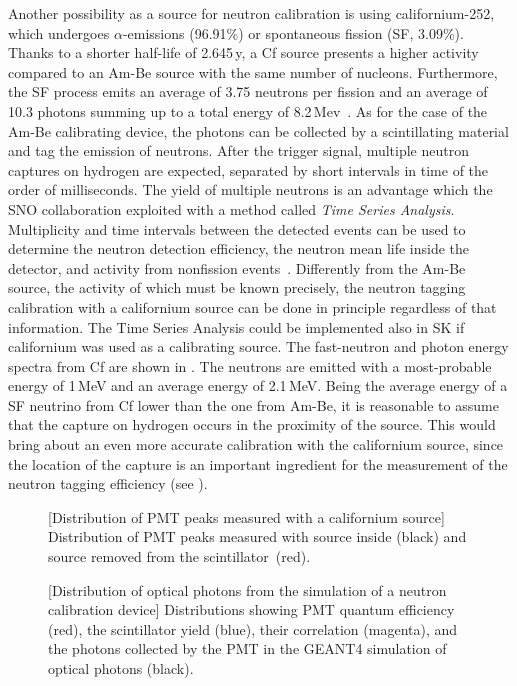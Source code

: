 Another possibility as a source for neutron calibration is using californium-252, which %
undergoes $\alpha$-emissions (96.91\%) or spontaneous fission (SF, 3.09\%).
Thanks to a shorter half-life of 2.645\,y, a Cf source presents a higher activity compared to an Am-Be source %
with the same number of nucleons.
Furthermore, the SF process emits an average of 3.75 neutrons per fission and an average of 10.3 photons %
summing up to a total energy of 8.2\,Mev~\cite{PhysRev.104.699}.
As for the case of the Am-Be calibrating device, the photons can be collected by a scintillating material %
and tag the emission of neutrons.
After the trigger signal, multiple neutron captures on hydrogen are expected, separated by short intervals in time %
of the order of milliseconds.
The yield of multiple neutrons is an advantage which the SNO collaboration exploited with a method %
called \emph{Time Series Analysis}.
Multiplicity and time intervals between the detected events can be used to determine the neutron detection efficiency, %
the neutron mean life inside the detector, and activity from nonfission events~\cite{Labranche:2004sya}.
Differently from the Am-Be source, the activity of which must be known precisely, the neutron tagging calibration %
with a californium source can be done in principle regardless of that information.
The Time Series Analysis could be implemented also in SK if californium was used as a calibrating source.
The fast-neutron and photon energy spectra from Cf are shown in . 
The neutrons are emitted with a most-probable energy of 1\,MeV and an average energy of 2.1\,MeV.
Being the average energy of a SF neutrino from Cf lower than the one from Am-Be, %
it is reasonable to assume that the capture on hydrogen occurs in the proximity of the source.
This would bring about an even more accurate calibration with the californium source, %
since the location of the capture is an important ingredient for the measurement %
of the neutron tagging efficiency (see ).


\begin{figure}
	\begin{minipage}[t]{0.48\textwidth}
		\centering
		\resizebox{\textwidth}{!}{}
		[Distribution of PMT peaks measured with a californium source]%
		{Distribution of PMT peaks measured with source inside (black) and source removed from the scintillator~(red).}
		\label{fig:source}
	\end{minipage}
	\hfill
	\begin{minipage}[t]{0.48\textwidth}
		\centering
		\resizebox{\textwidth}{!}{}
		[Distribution of optical photons from the simulation of a neutron calibration device]{%
			Distributions showing PMT quantum efficiency (red), the scintillator yield (blue), %
			their correlation (magenta), and the photons collected by the PMT in the GEANT4 %
			simulation of optical photons (black).}
		\label{fig:QE}
	\end{minipage}
\end{figure}

